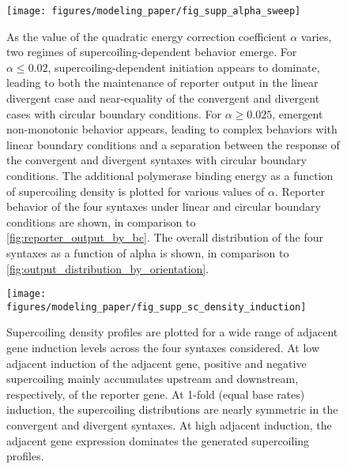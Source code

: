 \documentclass[11pt]{article}
\begin{document}
\begin{figure}[hbtp]
    \centering
    {\texttt{[image: figures/modeling\_paper/fig\_supp\_alpha\_sweep]}
    \label{fig:supp_alpha_sweep_energy}
    \label{fig:supp_alpha_sweep_linear}
    \label{fig:supp_alpha_sweep_circular}
    \label{fig:supp_alpha_sweep_distribution}
    }
    \caption{As the value of the quadratic energy correction coefficient \(\alpha\) varies, two regimes of supercoiling-dependent behavior emerge. For \(\alpha \leq 0.02\), supercoiling-dependent initiation appears to dominate, leading to both the maintenance of reporter output in the linear divergent case and near-equality of the convergent and divergent cases with circular boundary conditions. For \(\alpha \geq 0.025\), emergent non-monotonic behavior appears, leading to complex behaviors with linear boundary conditions and a separation between the response of the convergent and divergent syntaxes with circular boundary conditions.
         The additional polymerase binding energy as a function of supercoiling density is plotted for various values of \(\alpha\).
          Reporter behavior of the four syntaxes under linear and circular boundary conditions are shown, in comparison to \cref{fig:reporter_output_by_bc}.
         The overall distribution of the four syntaxes as a function of alpha is shown, in comparison to \cref{fig:output_distribution_by_orientation}.
    }
    \label{fig:top:alpha_sweep}
\end{figure}

\begin{figure}[hbtp]
    \centering
    {\texttt{[image: figures/modeling\_paper/fig\_supp\_sc\_density\_induction]}
    }
    \caption{Supercoiling density profiles are plotted for a wide range of adjacent gene induction levels across the four syntaxes considered. At low adjacent induction of the adjacent gene, positive and negative supercoiling mainly accumulates upstream and downstream, respectively, of the reporter gene. At 1-fold (equal base rates) induction, the supercoiling distributions are nearly symmetric in the convergent and divergent syntaxes. At high adjacent induction, the adjacent gene expression dominates the generated supercoiling profiles.}
    \label{fig:supp:sc_density_induction}
\end{figure}
\end{document}
